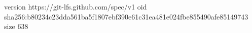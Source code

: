 version https://git-lfs.github.com/spec/v1
oid sha256:b80234c23dda561ba5f1807ebf390e61c31ea481e024fbe855490afe85149743
size 638
